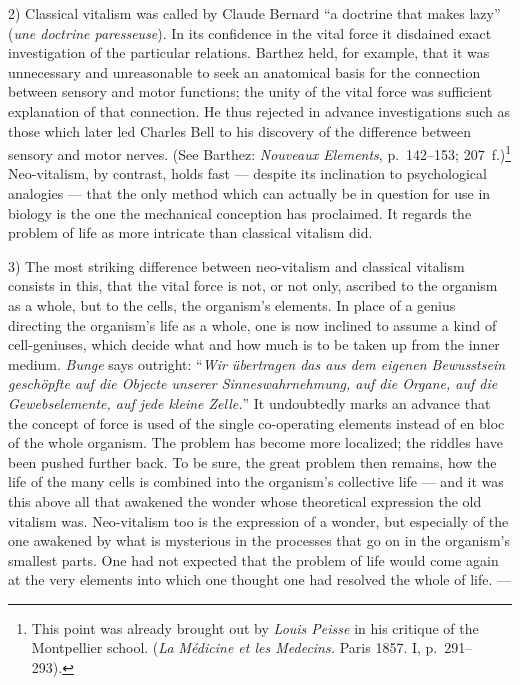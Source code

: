 \documentclass[12pt,a4paper]{article}
\begin{document}
2) Classical vitalism was called by Claude Bernard ``a doctrine that makes
lazy'' (\textit{une doctrine paresseuse}). In its confidence in the vital force
it disdained exact investigation of the particular relations. Barthez held, for
example, that it was unnecessary and unreasonable to seek an anatomical basis
for the connection between sensory and motor functions; the unity of the vital
force was sufficient explanation of that connection. He thus rejected in advance
investigations such as those which later led Charles Bell to his discovery of
the difference between sensory and motor nerves. (See Barthez: \textit{Nouveaux
Elements}, p.~142--153; 207~f.)\footnote{This point was already brought out by
\emph{Louis Peisse} in his critique of the Montpellier school. (\textit{La
Médicine et les Medecins.} Paris 1857. I, p.~291--293).} Neo-vitalism, by
contrast, holds fast --- despite its inclination to psychological analogies ---
that the only method which can actually be in question for use in biology is the
one the mechanical conception has proclaimed. It regards the problem of life as
more intricate than classical vitalism did.

3) The most striking difference between neo-vitalism and classical vitalism
consists in this, that the vital force is not, or not only, ascribed to the
organism as a whole, but to the cells, the organism's elements. In place of a
genius directing the organism's life as a whole, one is now inclined to assume a
kind of cell-geniuses, which decide what and how much is to be taken up from the
inner medium. \emph{Bunge} says outright: ``\textit{Wir übertragen das aus dem
eigenen Bewusstsein geschöpfte auf die Objecte unserer Sinneswahrnehmung, auf
die Organe, auf die Gewebselemente, auf jede kleine Zelle.}'' It undoubtedly
marks an advance that the concept of force is used of the single co-operating
elements instead of
en bloc of the whole organism. The problem has become more localized; the
riddles have been pushed further back. To be sure, the great problem then
remains, how the life of the many cells is combined into the organism's
collective life --- and it was this above all that awakened the wonder whose
theoretical expression the old vitalism was. Neo-vitalism too is the expression
of a wonder, but especially of the one awakened by what is mysterious in the
processes that go on in the organism's smallest parts. One had not expected that
the problem of life would come again at the very elements into which one thought
one had resolved the whole of life. ---
\end{document}

